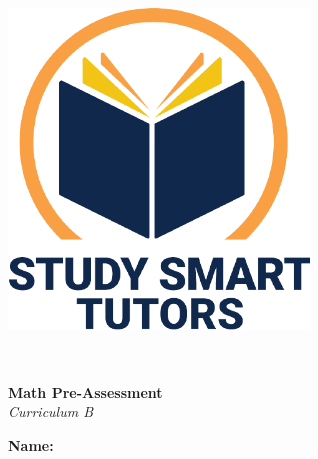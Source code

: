 \documentclass[12pt]{article}
\title{}
\date{}
\begin{document}
\thispagestyle{empty}

\vspace*{\fill}

\vspace*{3cm}

\begin{center}

    \includegraphics[width=0.6\textwidth]{SST_Color_Logo.png} %
    
    \vspace{1cm} %
    
    \Huge \textbf{} \\
    \vspace{0.2cm}
    
    \Huge \textbf{ Math Pre-Assessment}\\ 
 \vspace{2cm}
    \LARGE \textit{Curriculum B}\\  
    [2cm]

 \vspace{0.5cm}
    
   


    \LARGE \textbf{Name:} \underline{\hspace{8cm}}
    
    
    \vspace{0.5cm}
    
    \vspace{1cm}
   
    
    \vfill %
    
\end{center}
\end{document}
